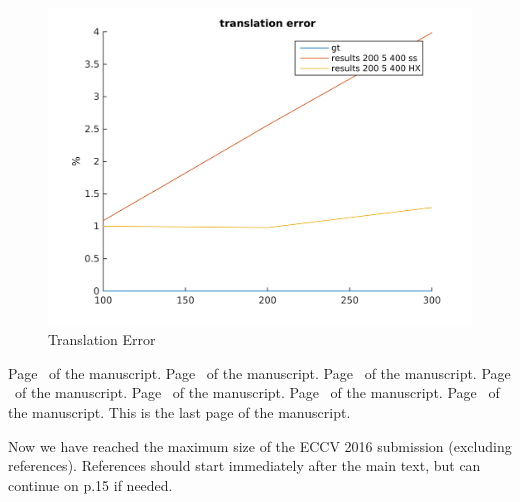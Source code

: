 \documentclass[runningheads]{llncs}
\begin{document}
\begin{figure}
\begin{minipage}[b]{0.45\linewidth}
    \includegraphics[scale=.4]{translation_error}
    \caption{Translation Error}
    \label{fig:4trans_error}
  \end{minipage}
\end{figure}

\clearpage\mbox{}Page \thepage\ of the manuscript.
\clearpage\mbox{}Page \thepage\ of the manuscript.
\clearpage\mbox{}Page \thepage\ of the manuscript.
\clearpage\mbox{}Page \thepage\ of the manuscript.
\clearpage\mbox{}Page \thepage\ of the manuscript.
\clearpage\mbox{}Page \thepage\ of the manuscript.
\clearpage\mbox{}Page \thepage\ of the manuscript.  This is the last
page of the manuscript.
\par\vfill\par
Now we have reached the maximum size of the ECCV 2016 submission (excluding references).
References should start immediately after the main text, but can continue on p.15 if needed.

\clearpage



\end{document}
